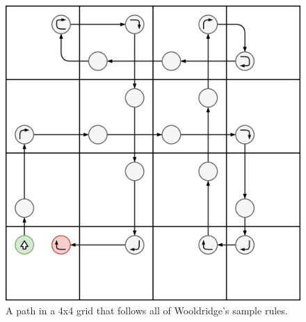 \documentclass[11pt]{article}
\begin{document}
\begin{figure}[!htbp]
\centering
\includegraphics[scale=0.3]{vacuum4x4.png}
\caption{A path in a 4x4 grid that follows all of Wooldridge's sample rules.}
\label{fig:vacuum4x4}
\end{figure}
\end{document}

